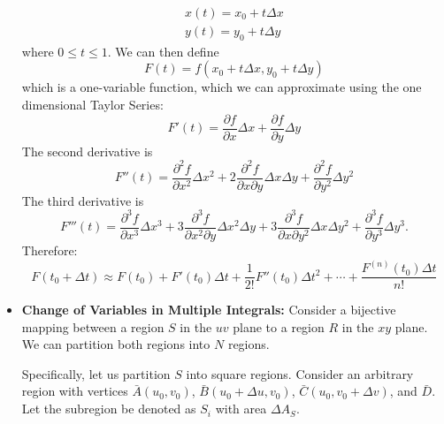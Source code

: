\begin{itemize}
    \begin{align}
        x(t) = x_0 + t\Delta x \\ 
        y(t) = y_0 + t\Delta y
    \end{align}
    where $0 \le t \le 1$. We can then define 
    \begin{equation}
        F(t) = f(x_0+t\Delta x,y_0+t\Delta y)
    \end{equation}
    which is a one-variable function, which we can approximate using the one dimensional Taylor Series: 
    \begin{equation}
        F'(t) = \frac{\partial f}{\partial x}\Delta x + \frac{\partial f}{\partial y}\Delta y
    \end{equation}
    The second derivative is 
    \begin{equation}
        F''(t)  = \frac{\partial^2 f}{\partial x^2}\Delta x^2 + 2\frac{\partial^2 f}{\partial x\partial y}\Delta x\Delta y + \frac{\partial^2 f}{\partial y^2}\Delta y^2
    \end{equation}
    The third derivative is
    \begin{equation}
        F'''(t) = \frac{\partial^3f}{\partial x^3}\Delta x^3 + 3\frac{\partial^3 f}{\partial x^2\partial y}\Delta x^2\Delta y + 3\frac{\partial^3 f}{\partial x\partial y^2}\Delta x\Delta y^2 + \frac{\partial^3f}{\partial y^3}\Delta y^3 .
    \end{equation}
    Therefore: 
    \begin{equation}
        F(t_0+\Delta t)\approx F(t_0) + F'(t_0)\Delta t + \frac{1}{2!}F''(t_0)\Delta t^2 + \cdots + \frac{F^{(n)}(t_0)\Delta t}{n!}
    \end{equation}
    \item \textbf{Change of Variables in Multiple Integrals:} Consider a bijective mapping between a region $S$ in the $uv$ plane to a region $R$ in the $xy$ plane. We can partition both regions into $N$ regions.
    
    Specifically, let us partition $S$ into square regions. Consider an arbitrary region with vertices $\bar{A}(u_0,v_0)$, $\bar{B}(u_0+\Delta u, v_0)$, $\bar{C}(u_0,v_0+\Delta v)$, and $\bar{D}$. Let the subregion be denoted as $S_i$ with area $\Delta A_S$.


\end{itemize}
